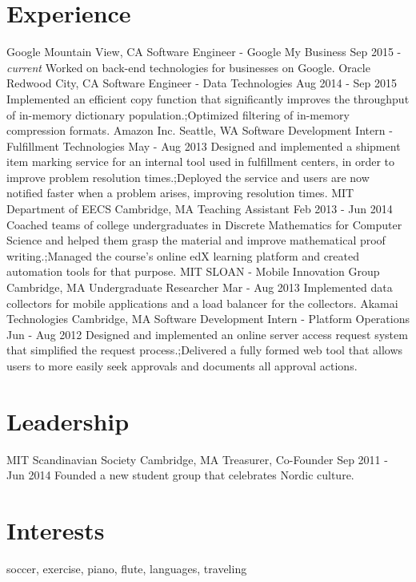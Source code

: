 \documentclass[]{friggeri-cv}
\begin{document}
\section{Experience}

\begin{entrylist}
\expentry
    {Google}
    {Mountain View, CA}
    {Software Engineer - Google My Business}
    {Sep 2015 - \textit{current}}
    {Worked on back-end technologies for businesses on Google.}
  \expentry
    {Oracle}
    {Redwood City, CA}
    {Software Engineer - Data Technologies}
    {Aug 2014 - Sep 2015}
    {Implemented an efficient copy function that significantly improves the throughput of in-memory dictionary population.;Optimized filtering of in-memory compression formats.}
  \expentry
    {Amazon Inc.}
    {Seattle, WA}
    {Software Development Intern - Fulfillment Technologies}
    {May - Aug 2013}
    {Designed and implemented a shipment item marking service for an internal tool used in fulfillment centers, in order to improve problem resolution times.;Deployed the service and users are now notified faster when a problem arises, improving resolution times.}
  \expentry
    {MIT Department of EECS}
    {Cambridge, MA}
    {Teaching Assistant}
    {Feb 2013 - Jun 2014}
    {Coached teams of college undergraduates in Discrete Mathematics for Computer Science and helped them grasp the material and improve mathematical proof writing.;Managed the course’s online edX learning platform and created automation tools for that purpose.}
  \expentry
    {MIT SLOAN - Mobile Innovation Group}
    {Cambridge, MA}
    {Undergraduate Researcher}
    {Mar - Aug 2013}
    {Implemented data collectors for mobile applications and a load balancer for the collectors.}
  \expentry
    {Akamai Technologies}
    {Cambridge, MA}
    {Software Development Intern - Platform Operations}
    {Jun - Aug 2012}
    {Designed and implemented an online server access request system that simplified the request process.;Delivered a fully formed web tool that allows users to more easily seek approvals and documents all approval actions.}
\end{entrylist}

\section{Leadership}
\begin{entrylist}
  \expentry
    {MIT Scandinavian Society}
    {Cambridge, MA}
    {Treasurer, Co-Founder}
    {Sep 2011 - Jun 2014}
    {Founded a new student group that celebrates Nordic culture.}
\end{entrylist}

\section{Interests}
    soccer, exercise, piano, flute, languages, traveling
\end{document}
